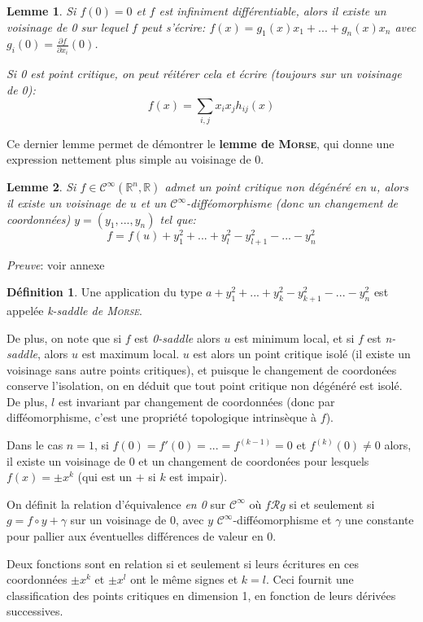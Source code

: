 \documentclass{article}
\newcommand{\cinf}{\mathcal{C}^\infty}
\newcommand{\R}{\mathbb{R}}
\theoremstyle{definition}
\newtheorem{defn}{Définition}
\theoremstyle{plain}
\newtheorem{lemm}{Lemme}
\begin{document}
\begin{lemm}
Si $f(0)=0$ et $f$ est infiniment différentiable, alors il existe un voisinage de 0 sur lequel $f$ peut s'écrire: $f(x)=g_1(x)x_1+...+g_n(x)x_n$ avec $g_i(0) = \frac{\partial f}{\partial x_i}(0)$.

Si 0 est point critique, on peut réitérer cela et écrire (toujours sur un voisinage de 0): $$f(x)=\sum_{i,j} x_ix_jh_{ij}(x)$$
\end{lemm}

Ce dernier lemme permet de démontrer le \textbf{lemme de \textsc{Morse}}, qui donne une expression nettement plus simple au voisinage de $0$.

\begin{lemm}
Si $f\in\cinf(\R^n,\R)$ admet un point critique non dégénéré en $u$, alors il existe un voisinage de $u$ et un $\cinf$-difféomorphisme (donc un changement de coordonnées) $y=(y_1,...,y_n)$ tel que: $$f=f(u)+y_1^2+...+y_l^2-y_{l+1}^2-...-y_n^2$$
\end{lemm}

\textit{Preuve}: voir annexe

\begin{defn}
Une application du type $a+y_1^2+...+y_k^2-y_{k+1}^2-...-y_n^2$ est appelée \textit{k-saddle de \textsc{Morse}}.
\end{defn}

De plus, on note que si $f$ est \textit{0-saddle} alors $u$ est minimum local, et si $f$ est \textit{n-saddle}, alors $u$ est maximum local.
$u$ est alors un point critique isolé (il existe un voisinage sans autre points critiques), et puisque le changement de coordonées conserve l'isolation, on en déduit que tout point critique non dégénéré est isolé. De plus, $l$ est invariant par changement de coordonnées (donc par difféomorphisme, c'est une propriété topologique intrinsèque à $f$).

Dans le cas $n=1$, si $f(0)=f'(0)=...=f^{(k-1)}=0$ et $f^{(k)}(0)\neq 0$ alors, il existe un voisinage de 0 et un changement de coordonées pour lesquels $f(x)=\pm x^k$ (qui est un $+$ si $k$ est impair).

On définit la relation d'équivalence \textit{en 0} sur $\cinf$ où $f \mathcal{R} g$ si et seulement si $g=f\circ y + \gamma$ sur un voisinage de 0, avec $y$ $\cinf$-difféomorphisme et $\gamma$ une constante pour pallier aux éventuelles différences de valeur en 0.

Deux fonctions sont en relation si et seulement si leurs écritures en ces coordonnées $\pm x^k$ et $\pm x^l$ ont le même signes et $k=l$. Ceci fournit une classification des points critiques en dimension 1, en fonction de leurs dérivées successives.
\end{document}
